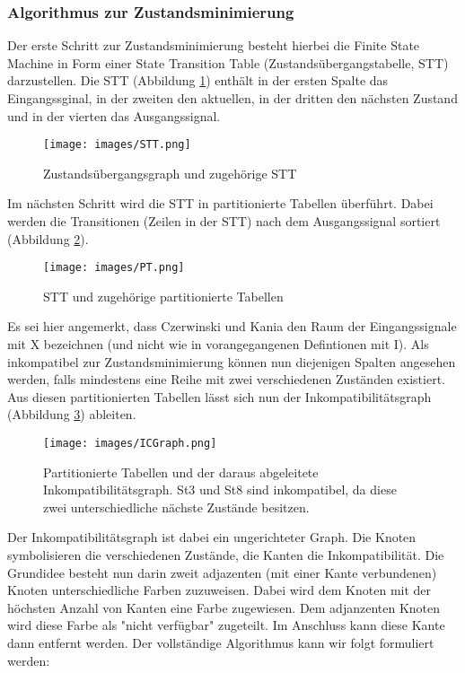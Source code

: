 \subsubsection{Algorithmus zur Zustandsminimierung}
\label{subsubsec:AlgStateMinimization}
Der erste Schritt zur Zustandsminimierung besteht hierbei die Finite State Machine in Form einer State Transition Table (Zustandsübergangstabelle, STT) darzustellen. Die STT (Abbildung \ref{img:FSM2STT}) enthält in der ersten Spalte das Eingangssginal, in der zweiten den aktuellen, in der dritten den nächsten Zustand und in der vierten das Ausgangssignal.
\begin{figure}
	\centering
	\texttt{[image: images/STT.png]}
	\caption{Zustandsübergangsgraph und zugehörige STT \cite{CK13}}
	\label{img:FSM2STT}
\end{figure}
Im nächsten Schritt wird die STT in partitionierte Tabellen überführt. Dabei werden die Transitionen (Zeilen in der STT) nach dem Ausgangssignal sortiert (Abbildung \ref{img:STT2PT}).
\begin{figure}
	\centering
	\texttt{[image: images/PT.png]}
	\caption{STT und zugehörige partitionierte Tabellen \cite{CK13}}
	\label{img:STT2PT}
\end{figure}
Es sei hier angemerkt, dass Czerwinski und Kania den Raum der Eingangssignale mit X bezeichnen (und nicht wie in vorangegangenen Defintionen mit I). Als inkompatibel zur Zustandsminimierung können nun diejenigen Spalten angesehen werden, falls mindestens eine Reihe mit zwei verschiedenen Zuständen existiert. Aus diesen partitionierten Tabellen lässt sich nun der Inkompatibilitätsgraph (Abbildung \ref{img:PT2ICGraph}) ableiten.
\begin{figure}
	\centering
	\texttt{[image: images/ICGraph.png]}
	\caption{Partitionierte Tabellen und der daraus abgeleitete Inkompatibilitätsgraph. St3 und St8 sind inkompatibel, da diese zwei unterschiedliche nächste Zustände besitzen. \cite{CK13}}
	\label{img:PT2ICGraph}
\end{figure}
Der Inkompatibilitätsgraph ist dabei ein ungerichteter Graph. Die Knoten symbolisieren die verschiedenen Zustände, die Kanten die Inkompatibilität. Die Grundidee besteht nun darin zweit adjazenten (mit einer Kante verbundenen) Knoten unterschiedliche Farben zuzuweisen. Dabei wird dem Knoten mit der höchsten Anzahl von Kanten eine Farbe zugewiesen. Dem adjanzenten Knoten wird diese Farbe als "nicht verfügbar" zugeteilt. Im Anschluss kann diese Kante dann entfernt werden. Der vollständige Algorithmus kann wir folgt formuliert werden:
